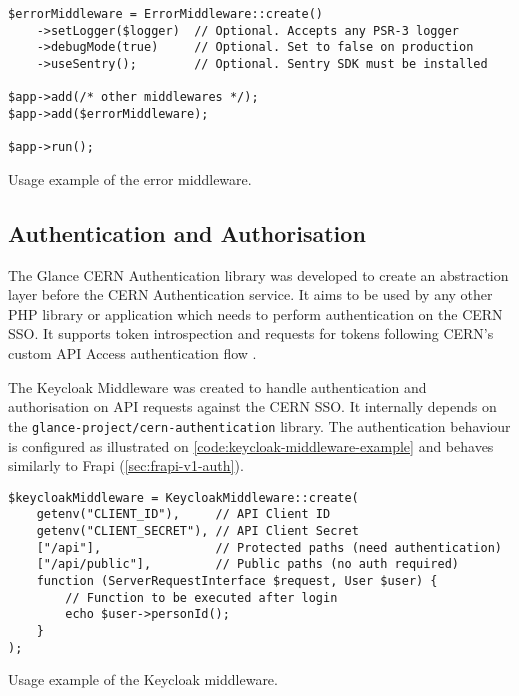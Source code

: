 \begin{listing}[htbp]
\begin{verbatim}
$errorMiddleware = ErrorMiddleware::create()
	->setLogger($logger)  // Optional. Accepts any PSR-3 logger
	->debugMode(true)     // Optional. Set to false on production
	->useSentry();        // Optional. Sentry SDK must be installed
	
$app->add(/* other middlewares */);
$app->add($errorMiddleware);

$app->run();
\end{verbatim}
\caption{Usage example of the error middleware.}
\end{listing}

\subsection{Authentication and Authorisation}
\label{sec:authentication-and-authorisation}

The Glance CERN Authentication library \cite{cern-authentication-lib} was developed to create an abstraction layer before the CERN Authentication service. It aims to be used by any other PHP library or application which needs to perform authentication on the CERN SSO. It supports token introspection \cite{oauth-token-introspection} \cite{cern-auth-lib-introspec-token} and requests for tokens following CERN's custom API Access authentication flow \cite{cern-auth-service-api-access} \cite{cern-auth-lib-api-access}.

The Keycloak Middleware \cite{keycloak-middleware} was created to handle authentication and authorisation on API requests against the CERN SSO. It internally depends on the \texttt{glance-project/cern-authentication} library. The authentication behaviour is configured as illustrated on \autoref{code:keycloak-middleware-example} and behaves similarly to Frapi (\autoref{sec:frapi-v1-auth}).

\begin{listing}[htbp]
\begin{verbatim}
$keycloakMiddleware = KeycloakMiddleware::create(
    getenv("CLIENT_ID"),     // API Client ID
    getenv("CLIENT_SECRET"), // API Client Secret
    ["/api"],                // Protected paths (need authentication)
    ["/api/public"],         // Public paths (no auth required)
    function (ServerRequestInterface $request, User $user) {
	    // Function to be executed after login
        echo $user->personId();
    }
);
\end{verbatim}
\caption{Usage example of the Keycloak middleware.}
\label{code:keycloak-middleware-example}
\end{listing}

